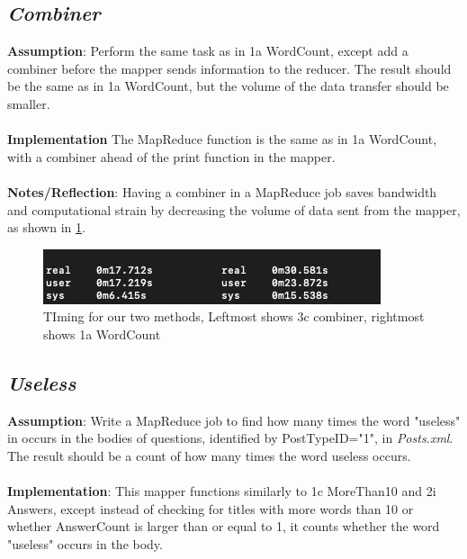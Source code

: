 \documentclass[fleqn,10pt]{wlscirep}
\begin{document}
\subsection{\emph{Combiner}}
\textbf{Assumption}: Perform the same task as in 1a WordCount, except add a combiner before the mapper sends information to the reducer. The result should be the same as in 1a WordCount, but the volume of the data transfer should be smaller. \\ \\
\textbf{Implementation} The MapReduce function is the same as in 1a WordCount, with a combiner ahead of the print function in the mapper. \\ \\
\textbf{Notes/Reflection}: Having a combiner in a MapReduce job saves bandwidth and computational strain by decreasing the volume of data sent from the mapper, as shown in \ref{fig:figure_label}.


\begin{figure}[H]
\centering
\includegraphics[width=1\linewidth]{images/time.png}
\caption{TIming for our two methods, Leftmost shows 3c combiner, rightmost shows 1a WordCount}
\label{fig:figure_label}
\end{figure}

\subsection{\emph{Useless}}
\textbf{Assumption}: Write a MapReduce job to find how many times the word "useless" in occurs in the bodies of questions, identified by PostTypeID="1", in \textit{Posts.xml}. The result should be a count of how many times the word useless occurs. \\ \\
\textbf{Implementation}: This mapper functions similarly to 1c MoreThan10 and 2i Answers, except instead of checking for titles with more words than 10 or whether AnswerCount is larger than or equal to 1, it counts whether the word "useless" occurs in the body. \\ \\

\end{document}
